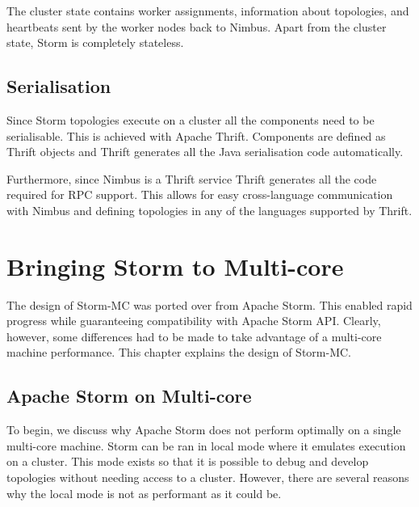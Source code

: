 \documentclass[bsc,logo,frontabs,twoside,singlespacing,normalheadings,parskip]{infthesis}     %
\begin{document}
The cluster state contains worker assignments, information about topologies, and heartbeats sent by the worker nodes back to Nimbus. Apart from the cluster state, Storm is completely stateless.

\section{Serialisation}
\label{sec:serialisation}

Since Storm topologies execute on a cluster all the components need to be serialisable. This is achieved with Apache Thrift. Components are defined as Thrift objects and Thrift generates all the Java serialisation code automatically.

Furthermore, since Nimbus is a Thrift service Thrift generates all the code required for RPC support. This allows for easy cross-language communication with Nimbus and defining topologies in any of the languages supported by Thrift.




\chapter{Bringing Storm to Multi-core}



The design of Storm-MC was ported over from Apache Storm. This enabled rapid progress while guaranteeing compatibility with Apache Storm API. Clearly, however, some differences had to be made to take advantage of a multi-core machine performance. This chapter explains the design of Storm-MC.

\section{Apache Storm on Multi-core}

To begin, we discuss why Apache Storm does not perform optimally on a single multi-core machine. Storm can be ran in local mode where it emulates execution on a cluster. This mode exists so that it is possible to debug and develop topologies without needing access to a cluster. However, there are several reasons why the local mode is not as performant as it could be.
\end{document}
